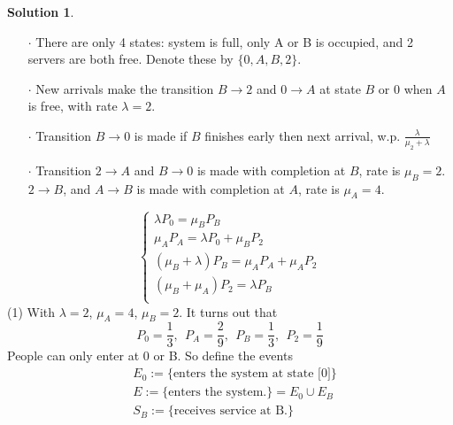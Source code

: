 \documentclass[a4paper, 10pt]{article}
\theoremstyle{definition}
\theoremstyle{hSol}
\newtheorem*{solution}{Solution}
\begin{document}
\begin{solution}~
\begin{itemize}
  \item[$\cdot$] There are only 4 states: system is full, only A or B is occupied, and 2 servers are both free. Denote these by $\{0, A, B, 2\}$. 
  \item[$\cdot$] New arrivals make the transition $B\to 2$ and $0\to A$ at state $B$ or $0$ when $A$ is free, with rate $\lambda=2$.
  \item[$\cdot$] Transition $B\to 0$ is made if $B$ finishes early then next arrival, w.p. $\frac{\lambda}{\mu_2+\lambda}$
  \item[$\cdot$] Transition $2\to A$ and $B\to 0$ is made with completion at $B$, rate is $\mu_B=2$. $2\to B$, and $A\to B$ is made with completion at $A$, rate is $\mu_A=4$.
\end{itemize}
\begin{center}
\end{center}
\begin{equation}
  \begin{cases}
    \lambda P_0 = \mu_B P_B \\
    \mu_A P_A = \lambda P_0 + \mu_B P_2 \\
    (\mu_B + \lambda) P_B = \mu_A P_A + \mu_A P_2 \\
    (\mu_B + \mu_A) P_2 = \lambda P_B  \\
  \end{cases}
\end{equation}
(1) With $\lambda = 2$, $\mu_A = 4$, $\mu_B = 2$. It turns out that
\begin{equation}
  P_0 = \frac{1}{3},~~P_A = \frac{2}{9},~~P_B = \frac{1}{3},~~P_2 = \frac{1}{9}
\end{equation}
People can only enter at 0 or B. So define the events
\begin{equation}
  \begin{split}
    & E_0:=\{\text{enters the system at state [0]}\} \\
    & E:=\{\text{enters the system.}\}=E_0\cup E_B \\
    & S_B:=\{\text{receives service at B.}\}
  \end{split}
\end{equation}


\end{solution}
\end{document}
